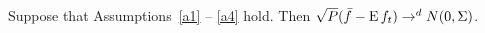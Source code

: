 Suppose that Assumptions~\ref{a1} -- \ref{a4} hold.  Then $\sqrt{P}
(\bar{f} - \operatorname{E} f_t) \to^d N(0, \Sigma)$.
